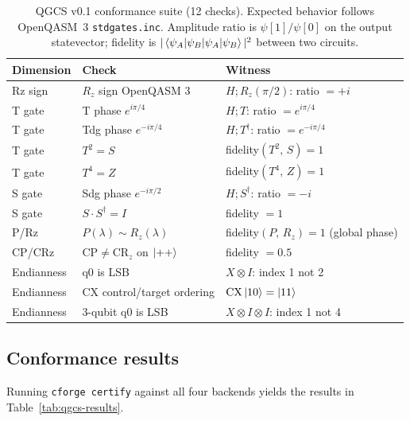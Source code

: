 \documentclass[11pt,a4paper]{article}
\begin{document}
\begin{table}[h!]
\centering
\caption{QGCS v0.1 conformance suite (12 checks). Expected behavior
         follows OpenQASM~3 \texttt{stdgates.inc}. Amplitude ratio is
         $\psi[1]/\psi[0]$ on the output statevector; fidelity is
         $|\braket{\psi_A|\psi_B}|^2$ between two circuits.}
\label{tab:qgcs}
\begin{tabular}{lll}
\toprule
Dimension   & Check                               & Witness \\
\midrule
Rz sign     & $R_z$ sign OpenQASM 3               & $H;R_z(\pi/2)$: ratio $= +i$ \\
T gate      & T phase $e^{i\pi/4}$                & $H;T$: ratio $= e^{i\pi/4}$ \\
T gate      & Tdg phase $e^{-i\pi/4}$             & $H;T^\dag$: ratio $= e^{-i\pi/4}$ \\
T gate      & $T^2 = S$                           & fidelity$(T^2,\,S) = 1$ \\
T gate      & $T^4 = Z$                           & fidelity$(T^4,\,Z) = 1$ \\
S gate      & Sdg phase $e^{-i\pi/2}$             & $H;S^\dag$: ratio $= -i$ \\
S gate      & $S \cdot S^\dag = I$                & fidelity $= 1$ \\
P/Rz        & $P(\lambda) \sim R_z(\lambda)$      & fidelity$(P,\,R_z) = 1$ (global phase) \\
CP/CRz      & $\mathrm{CP}\neq\mathrm{CR}_z$ on $\ket{++}$ & fidelity $= 0.5$ \\
Endianness  & q0 is LSB                           & $X \otimes I$: index 1 not 2 \\
Endianness  & CX control/target ordering          & $\mathrm{CX}\ket{10}=\ket{11}$ \\
Endianness  & 3-qubit q0 is LSB                   & $X \otimes I \otimes I$: index 1 not 4 \\
\bottomrule
\end{tabular}
\end{table}

\subsection{Conformance results}

Running \texttt{cforge certify} against all four backends yields the results
in Table~\ref{tab:qgcs-results}.
\end{document}
